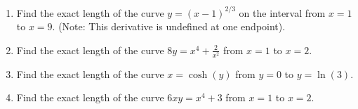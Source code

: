 \documentclass[12pt]{article}
\begin{document}
\begin{enumerate}
    \item Find the exact length of the curve $y = (x-1)^{2/3}$ on the interval from $x=1$ to $x=9$. (Note: This derivative is undefined at one endpoint).
    
    \item Find the exact length of the curve $8y = x^4 + \frac{2}{x^2}$ from $x=1$ to $x=2$.
    
    \item Find the exact length of the curve $x = \cosh(y)$ from $y=0$ to $y=\ln(3)$.
    
    \item Find the exact length of the curve $6xy = x^4 + 3$ from $x=1$ to $x=2$.

\end{enumerate}

\newpage
\end{document}
